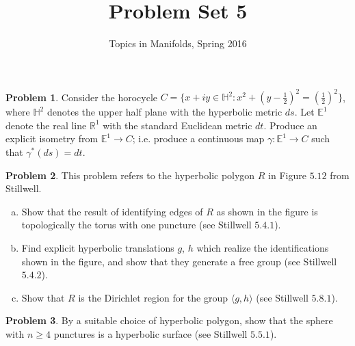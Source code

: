 \documentclass{amsart}
\newcommand{\+}[1]{\ensuremath{\mathbf{#1}}}
\newcommand{\R}{{\mathbb R}}
\theoremstyle{definition}
\newtheorem{prob}{Problem}
\begin{document}
\title{Problem Set 5}
\author{Topics in Manifolds, Spring 2016}

\maketitle

\begin{prob}
Consider the horocycle $C = \{x + iy \in \mathbb{H}^2 : x^2 + (y - \frac{1}{2})^2 = (\frac{1}{2})^2\}$, where $\mathbb{H}^2$ denotes the upper half plane with the hyperbolic metric $ds$.   Let $\mathbb{E}^1$ denote the real line $\R^1$ with the standard Euclidean metric $dt$.  Produce an explicit isometry from $\mathbb{E}^1 \to C$; i.e. produce a continuous map $\gamma: \mathbb{E}^1 \to C$ such that $\gamma^*(ds) = dt$.
\end{prob}

\begin{prob}
This problem refers to the hyperbolic polygon $R$ in Figure $5.12$ from Stillwell.
\begin{enumerate}[(a)]
 \item Show that the result of identifying edges of $R$ as shown in the figure
 is topologically the torus with one puncture (see Stillwell $5.4.1$).
\item Find explicit hyperbolic translations $g$, $h$ which 
realize the identifications shown in the figure, and show
that they generate a free group (see Stillwell $5.4.2$).
\item Show that $R$ is the Dirichlet region for the group $\langle g, h \rangle$ (see Stillwell $5.8.1$).
\end{enumerate}
\end{prob}


\begin{prob}
By a suitable choice of hyperbolic polygon, show that the sphere with $n \geq 4$ punctures
is a hyperbolic surface (see Stillwell $5.5.1$).
\end{prob}
\end{document}
